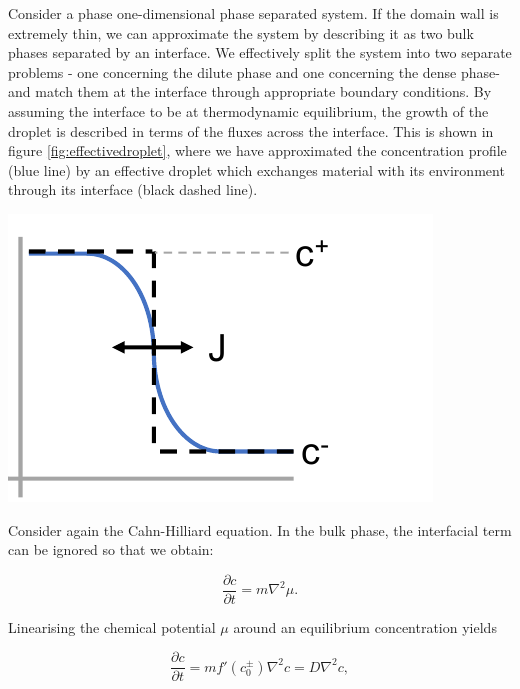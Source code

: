\documentclass{Dissertate}
\let\origfigure\figure
\let\endorigfigure\endfigure
\renewenvironment{figure}[1][2] {
    \expandafter\origfigure\expandafter[H]
} {
    \endorigfigure
}
\begin{document}
Consider a phase one-dimensional phase separated system. If the domain wall is extremely thin, we can approximate the system by describing it as two bulk phases separated by an interface. We effectively split the system into two separate problems - one concerning the dilute phase and one concerning the dense phase- and match them at the interface through appropriate boundary conditions. By assuming the interface to be at thermodynamic equilibrium, the growth of the droplet is described in terms of the fluxes across the interface. This is shown in figure \ref{fig:effectivedroplet}, where we have approximated the concentration profile (blue line) by an effective droplet which exchanges material with its environment through its interface (black dashed line).

\begin{figure}
\hypertarget{fig:effectivedroplet}{%
\centering
\includegraphics{source/figures/pdf/effectivedroplet.pdf}
\caption{Model of an effective droplet. Blue line is full Cahn-Hilliard model,
black dashed line effective droplet.}\label{fig:effectivedroplet}
}
\end{figure}

Consider again the Cahn-Hilliard equation. In the bulk phase, the interfacial term can be ignored so that we obtain:

\begin{equation}
\label{eq:diffusion}
\frac{\partial c}{\partial t} = m\nabla^2\mu.
\end{equation}

Linearising the chemical potential $\mu$ around an equilibrium concentration yields

\begin{equation}
\frac{\partial c }{\partial t} = mf'(c_0^\pm)\nabla^2c = D\nabla^2c,
\label{eq:diffusion}
\end{equation}
\end{document}
